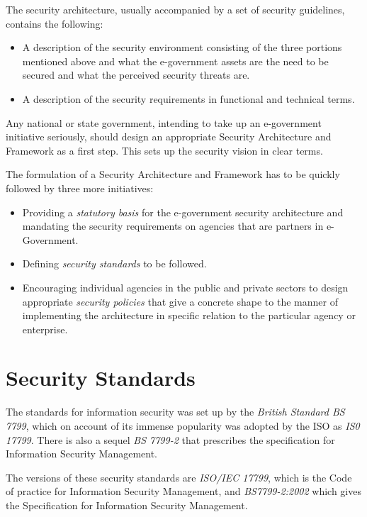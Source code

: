 The security architecture, usually accompanied by a set of security guidelines, contains the following:
\begin{itemize}
	\item A description of the security environment consisting of the three portions mentioned above and what the e-government assets are the need to be secured and what the perceived security threats are.
	
	\item A description of the security requirements in functional and technical terms.
\end{itemize}

Any national or state government, intending to take up an e-government initiative seriously, should design an appropriate Security Architecture and Framework as a first step. This sets up the security vision in clear terms.

The formulation of a Security Architecture and Framework has to be quickly followed by three more initiatives:

\begin{itemize}
	\item Providing a \textit{statutory basis} for the e-government security architecture and mandating the security requirements on agencies that are partners in e-Government.
	\item Defining \textit{security standards} to be followed.
	\item Encouraging individual agencies in the public and private sectors to design appropriate \textit{security policies} that give a concrete shape to the manner of implementing the architecture in specific relation to the particular agency or enterprise.
\end{itemize}
 
 \section{Security Standards}
 The standards for information security was set up by the \textit{British Standard BS 7799}, which on account of its immense popularity was adopted by the ISO as \textit{IS0 17799}. There is also a sequel \textit{BS 7799-2} that prescribes the specification for Information Security Management.
 
 The versions of these security standards are \textit{ISO/IEC 17799}, which is the Code of practice for Information Security Management, and \textit{BS7799-2:2002} which gives the Specification for Information Security Management.
 
